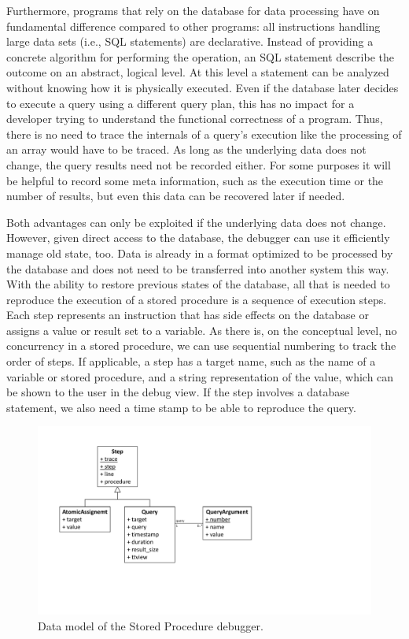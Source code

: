 Furthermore, programs that rely on the database for data processing have on fundamental difference compared to other programs:
all instructions handling large data sets (i.e., SQL statements) are declarative.
Instead of providing a concrete algorithm for performing the operation, an SQL statement describe the outcome on an abstract, logical level.
At this level a statement can be analyzed without knowing how it is physically executed.
Even if the database later decides to execute a query using a different query plan, this has no impact for a developer trying to understand the functional correctness of a program.
Thus, there is no need to trace the internals of a query's execution like the processing of an array would have to be traced.
As long as the underlying data does not change, the query results need not be recorded either.
For some purposes it will be helpful to record some meta information, such as the execution time or the number of results, but even this data can be recovered later if needed.

Both advantages can only be exploited if the underlying data does not change.
However, given direct access to the database, the debugger can use it efficiently manage old state, too.
Data is already in a format optimized to be processed by the database and does not need to be transferred into another system this way.
With the ability to restore previous states of the database, 
\tmpStart
all that is needed to reproduce the execution of a stored procedure is a sequence of execution steps.
Each step represents an instruction that has side effects on the database or assigns a value or result set to a variable.
As there is, on the conceptual level, no concurrency in a stored procedure, we can use sequential numbering to track the order of steps.
If applicable, a step has a target name, such as the name of a variable or stored procedure, and a string representation of the value, which can be shown to the user in the debug view.
If the step involves a database statement, we also need a time stamp to be able to reproduce the query.
\tmpEnd

\begin{figure}
	\centering
		\includegraphics[width=0.9\linewidth]{img/model_sqlodb}
	\caption{Data model of the Stored Procedure debugger.}
	\label{fig:model_odb}
\end{figure}


